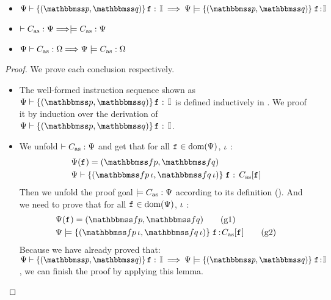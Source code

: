 \begin{lemma}
    \em
    \label{lemma:Logic Ensures Simulation} \mbox{}
    \begin{itemize}
        \item $\wdcblk{\Cspec}{\relastP}{\relastQ}{\lab{}}{\cblk}
            \implies 
            \semwfseqrel{\Cspec}{\relastP}{\relastQ}{\cblk}$
        \item $\vdash {C_{\text{as}}} : {\Psi} \Longrightarrow 
            \models C_{\text{as}}:\Psi$ 
        \item ${\Psi} \vdash {C_{\text{as}}} : {\Omega} \Longrightarrow
            {\Psi} \models {C_{\text{as}}} : {\Omega}$
    \end{itemize}
\end{lemma}
\begin{proof}
    We prove each conclusion respectively. 
    \begin{itemize}
        \item The well-formed instruction sequence shown as 
            $\wdcblk{\Cspec}{\relastP}{\relastQ}{\lab{}}{\cblk}$ 
            is defined inductively in 
            \Fig{\ref{fig:Selected Inference Rules for Refinement Verification}}. 
            We proof it by induction over the derivation of 
            $\wdcblk{\Cspec}{\relastP}{\relastQ}{\lab{}}{\cblk}$.

        \item We unfold $\vdash {C_{\text{as}}} : {\Psi}$ and get that 
            for all $\texttt{f}_{} \in \text{dom}(\Psi{})$, $\iota$ :
            \begin{align}
                & \Cspec(\lab{}) = (\relspecpre, \relspecpost)
                    \label{a:wfcdhp-spec} \\
                & \wfcblk{\relspecpre \, \lgvl}
                    {\relspecpost \, \lgvl}{\lab{}}{\asmimp[\lab{}]}
                    \label{a:wfcdblk}
            \end{align} 
            Then we unfold the proof goal $\models C_{\text{as}}:\Psi{}$
            according to its definition 
            (\Def{\ref{def:soundness of instruction sequence}}).
            And we need to prove that for all 
            $\texttt{f}_{} \in \text{dom}(\Psi{})$, $\iota$ : 
            \begin{align}
                & \Cspec{}(\lab{}) = (\relspecpre, \relspecpost)
                    \tag{g1} \label{g1} \\
                & \semwfseqrel{\Cspec{}}{\relspecpre \, \lgvl}
                    {\relspecpost \, \lgvl}{\asmimp[\lab{}]}
                    \tag{g2} \label{g2}
            \end{align}
            Because we have already proved that: 
            $\wdcblk{\Cspec}{\relastP}{\relastQ}{\lab{}}{\cblk}
            \implies 
            \semwfseqrel{\Cspec}{\relastP}{\relastQ}{\cblk}$, 
            we can finish the proof by applying this lemma. 
        

\end{itemize}
\end{proof}
